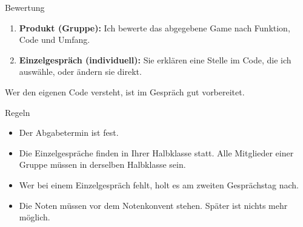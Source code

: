 \begin{frame}{Bewertung}
	\begin{enumerate}
		\item \textbf{Produkt (Gruppe):} Ich bewerte das abgegebene Game nach Funktion, Code und Umfang.
		\item \textbf{Einzelgespräch (individuell):} Sie erklären eine Stelle im Code, die ich auswähle, oder ändern sie direkt.
	\end{enumerate}
	\vspace{1em}
	Wer den eigenen Code versteht, ist im Gespräch gut vorbereitet.
\end{frame}

\begin{frame}{Regeln}
	\begin{itemize}
		\item Der Abgabetermin ist fest.
		\item Die Einzelgespräche finden in Ihrer Halbklasse statt. Alle Mitglieder einer Gruppe müssen in derselben Halbklasse sein.
		\item Wer bei einem Einzelgespräch fehlt, holt es am zweiten Gesprächstag nach.
		\item Die Noten müssen vor dem Notenkonvent stehen. Später ist nichts mehr möglich.
	\end{itemize}
\end{frame}
